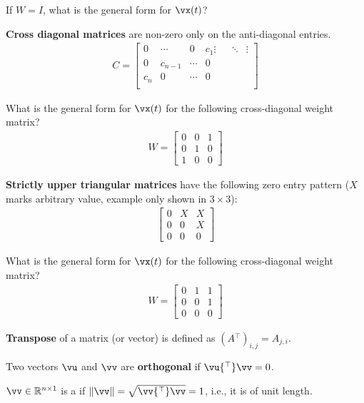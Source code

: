 \documentclass[a4paper,11pt]{exam}
\newcounter{ct}
\newcommand{\trp}{{^\top}} %
\newcommand{\norm}[1]{\ensuremath{\Vert{#1}\Vert}}
\newcommand{\field}[1]{\ensuremath{\mathbb{#1}}}
\newcommand{\reals}{\field{R}}
\begin{document}
\begin{questions}
\question If $W = I$, what is the general form for $\vx(t)$?

\textbf{Cross diagonal matrices} are non-zero only on the anti-diagonal entries.
\begin{align}\label{eq:LA:cdiag}
    C
    =
    \begin{bmatrix}
	0 & \cdots & 0 & c_1
	\vdots & & \ddots & \vdots \\
	0 & c_{n-1} & \cdots & 0 \\
	c_n & 0 & \cdots & 0 \\
    \end{bmatrix}
\end{align}

\question What is the general form for $\vx(t)$ for the following cross-diagonal weight matrix?
\begin{align}\label{eq:LA:cdiag:eg}
    W
    =
    \begin{bmatrix}
	0 & 0 & 1 \\
	0 & 1 & 0\\
	1 & 0 & 0
    \end{bmatrix}
\end{align}

\textbf{Strictly upper triangular matrices} have the following zero entry pattern ($X$ marks arbitrary value, example only shown in $3 \times 3$):
\begin{align}\label{eq:LA:suppertri}
    \begin{bmatrix}
	0 & X & X \\
	0 & 0 & X\\
	0 & 0 & 0
    \end{bmatrix}
\end{align}

\question What is the general form for $\vx(t)$ for the following cross-diagonal weight matrix?
\begin{align}\label{eq:LA:cdiag}
    W
    =
    \begin{bmatrix}
	0 & 1 & 1 \\
	0 & 0 & 1\\
	0 & 0 & 0
    \end{bmatrix}
\end{align}

\newpage
\begin{tcolorbox}
    \textbf{Transpose} of a matrix (or vector) is defined as $(A\trp)_{i,j} = A_{j,i}$.
\end{tcolorbox}
\begin{tcolorbox}
    Two vectors $\vu$ and $\vv$ are \textbf{orthogonal} if $\vu\trp \vv = 0$.
\end{tcolorbox}
\begin{tcolorbox}
    $\vv \in \reals^{n \times 1}$ is a  if $\norm{\vv} = \sqrt{\vv\trp \vv} = 1$, i.e., it is of unit length.
\end{tcolorbox}


\end{questions}
\end{document}
